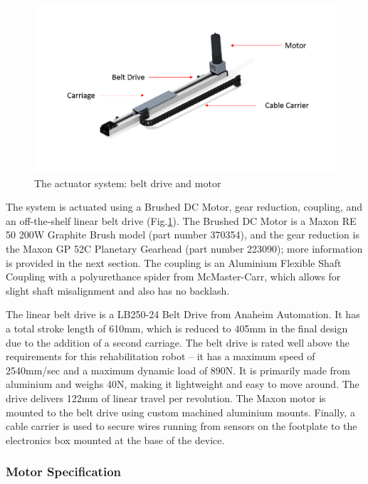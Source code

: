 \documentclass[12pt]{report}
\begin{document}
	\begin{figure}[h] 
		\centering
		\includegraphics[width=\linewidth]{actuator}
		\caption{The actuator system: belt drive and motor}
		\label{fig:actuator}
	\end{figure}
		
		
	The system is actuated using a Brushed DC Motor, gear reduction, coupling, and an off-the-shelf linear belt drive (Fig.\ref{fig:actuator}). The Brushed DC Motor is a Maxon RE 50 200W Graphite Brush model (part number 370354), and the gear reduction is the Maxon GP 52C Planetary Gearhead (part number 223090); more information is provided in the next section. The coupling is an Aluminium Flexible Shaft Coupling with a polyurethance spider from McMaster-Carr, which allows for slight shaft misalignment and also has no backlash. 
	
	The linear belt drive is a LB250-24 Belt Drive from Anaheim Automation. It has a total stroke length of 610mm, which is reduced to 405mm in the final design due to the addition of a second carriage. The belt drive is rated well above the requirements for this rehabilitation robot -- it has a maximum speed of 2540mm/sec and a maximum dynamic load of 890N. It is primarily made from aluminium and weighs 40N, making it lightweight and easy to move around. The drive delivers 122mm of linear travel per revolution. The Maxon motor is mounted to the belt drive using custom machined aluminium mounts. Finally, a cable carrier is used to secure wires running from sensors on the footplate to the electronics box mounted at the base of the device. 
	
	

	\subsubsection{Motor Specification}
	
\end{document}
